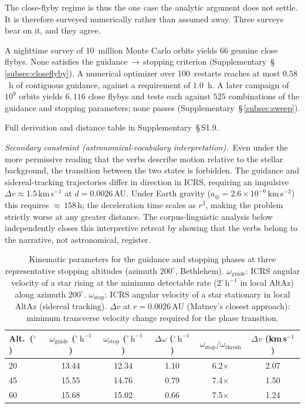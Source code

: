 \documentclass[sn-nature]{sn-jnl}
\begin{document}
The close-flyby regime is thus the one case the analytic argument does not
settle. It is therefore surveyed numerically rather than assumed away. Three
surveys bear on it, and they agree.

A nighttime survey of 10~million Monte Carlo orbits yields 66 genuine close
flybys. None satisfies the guidance\,$\to$\,stopping criterion
(Supplementary~\S\,\ref{subsec:closeflyby}). A numerical optimizer over
100~restarts reaches at most $0.58$~h of contiguous guidance, against a
requirement of $1.0$~h. A later campaign of $10^{9}$ orbits yields $6{,}116$
close flybys and tests each against $525$ combinations of the guidance and
stopping parameters; none passes
(Supplementary~\S\,\ref{subsec:sweep}).

Full derivation and distance table in Supplementary~\S\,S1.9.

\textit{Secondary constraint (astronomical-vocabulary interpretation).}~Even
under the more permissive reading that the verbs describe motion relative to
the stellar background, the transition between the two states is forbidden.
The guidance and sidereal-tracking trajectories differ in direction in ICRS,
requiring an impulsive $\Delta v \approx 1.5$\,km\,s$^{-1}$ at $d = 0.0026$\,AU.
Under Earth gravity ($a_\oplus = 2.6\times10^{-6}$\,km\,s$^{-2}$) this
requires ${\approx}\,158$\,h; the deceleration time scales as $r^3$,
making the problem strictly worse at any greater distance.
The corpus-linguistic analysis below independently closes this interpretive
retreat by showing that the verbs belong to the narrative, not astronomical,
register.

\begin{table}[h]
\caption{Kinematic parameters for the guidance and stopping phases at three
representative stopping altitudes (azimuth $200^\circ$, Bethlehem).
$\omega_\mathrm{guide}$: ICRS angular velocity of a star rising at the
minimum detectable rate ($2^\circ\,\mathrm{h}^{-1}$ in local AltAz) along
azimuth $200^\circ$.
$\omega_\mathrm{stop}$: ICRS angular velocity of a star stationary in local
AltAz (sidereal tracking).
$\Delta v$ at $r = 0.0026$\,AU (Matney's closest approach): minimum
transverse velocity change required for the phase transition.}\label{tab:kinematics}
\begin{tabular}{@{}lccccc@{}}
\toprule
Alt.\ ($^\circ$) & $\omega_\mathrm{guide}$ ($^\circ\,\mathrm{h}^{-1}$) &
  $\omega_\mathrm{stop}$ ($^\circ\,\mathrm{h}^{-1}$) &
  $\Delta\omega$ ($^\circ\,\mathrm{h}^{-1}$) &
  $\omega_\mathrm{stop}/\omega_\mathrm{thresh}$ &
  $\Delta v$ (km\,s$^{-1}$) \\
\midrule
20 & 13.44 & 12.34 & 1.10 & 6.2$\times$ & 2.07 \\
45 & 15.55 & 14.76 & 0.79 & 7.4$\times$ & 1.50 \\
60 & 15.68 & 15.02 & 0.66 & 7.5$\times$ & 1.24 \\
\bottomrule
\end{tabular}
\end{table}
\end{document}
